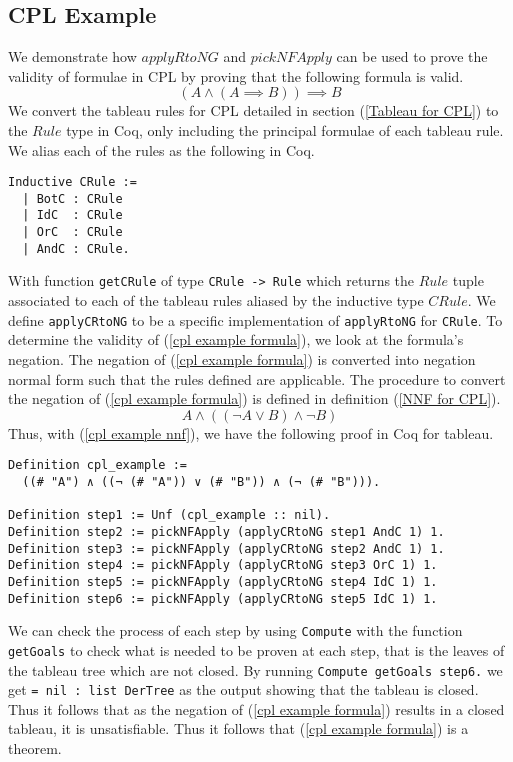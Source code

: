 \documentclass{llncs}
\begin{document}
\subsection{CPL Example}
%
We demonstrate how $applyRtoNG$ and $pickNFApply$ can be used to prove the
validity of formulae in CPL by proving that the following formula is valid.
%
\begin{equation}
(A \wedge (A \implies B)) \implies B
\label{cpl example formula}
\end{equation}
%
We convert the tableau rules for CPL detailed in section (\ref{Tableau for
CPL}) to the $Rule$ type in Coq, only including the principal formulae of each
tableau rule. We alias each of the rules as the following in Coq.
%
\begin{verbatim}
Inductive CRule := 
  | BotC : CRule
  | IdC  : CRule
  | OrC  : CRule
  | AndC : CRule.
\end{verbatim}
%
With function \verb+getCRule+ of type \verb+CRule -> Rule+ which returns the
$Rule$ tuple associated to each of the tableau rules aliased by the inductive
type $CRule$. We define \verb+applyCRtoNG+ to be a specific implementation of
\verb+applyRtoNG+ for \verb+CRule+. To determine the validity of (\ref{cpl
example formula}), we look at the formula's negation. The negation of (\ref{cpl
example formula}) is converted into negation normal form such that the rules
defined are applicable.  The procedure to convert the negation of (\ref{cpl
example formula}) is defined in definition (\ref{NNF for CPL}).
%
\begin{equation}
A \wedge ((\neg A \vee B) \wedge \neg B)
\label{cpl example nnf}
\end{equation}
%
Thus, with (\ref{cpl example nnf}), we have the following proof in Coq for
tableau.
%
\begin{verbatim}
Definition cpl_example :=
  ((# "A") ∧ ((¬ (# "A")) ∨ (# "B")) ∧ (¬ (# "B"))).

Definition step1 := Unf (cpl_example :: nil).
Definition step2 := pickNFApply (applyCRtoNG step1 AndC 1) 1.
Definition step3 := pickNFApply (applyCRtoNG step2 AndC 1) 1.
Definition step4 := pickNFApply (applyCRtoNG step3 OrC 1) 1.
Definition step5 := pickNFApply (applyCRtoNG step4 IdC 1) 1.
Definition step6 := pickNFApply (applyCRtoNG step5 IdC 1) 1.
\end{verbatim}
%
We can check the process of each step by using \verb+Compute+ with the function
\verb+getGoals+ to check what is needed to be proven at each step, that is the
leaves of the tableau tree which are not closed.
By running \verb+Compute getGoals step6.+ we get \verb+= nil : list DerTree+ as
the output showing that the tableau is closed. Thus it follows that as the
negation of (\ref{cpl example formula}) results in a closed tableau, it is 
unsatisfiable. Thus it follows that (\ref{cpl example formula}) is a theorem.
%
\end{document}
